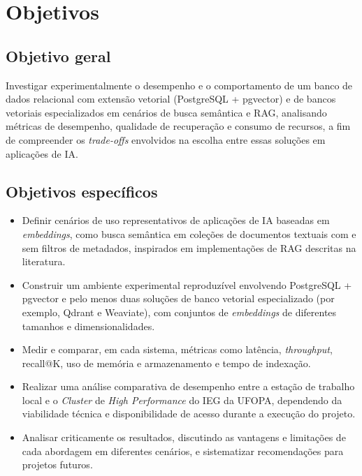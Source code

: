 
\section{Objetivos}

\subsection{Objetivo geral}

Investigar experimentalmente o desempenho e o comportamento de um banco de dados relacional com extensão vetorial (PostgreSQL + pgvector) e de bancos vetoriais especializados em cenários de busca semântica e RAG, analisando métricas de desempenho, qualidade de recuperação e consumo de recursos, a fim de compreender os \textit{trade-offs} envolvidos na escolha entre essas soluções em aplicações de IA.

\subsection{Objetivos específicos}

\begin{itemize}
    \item Definir cenários de uso representativos de aplicações de IA baseadas em \textit{embeddings}, como busca semântica em coleções de documentos textuais com e sem filtros de metadados, inspirados em implementações de RAG descritas na literatura.
    \item Construir um ambiente experimental reproduzível envolvendo PostgreSQL + pgvector e pelo menos duas soluções de banco vetorial especializado (por exemplo, Qdrant e Weaviate), com conjuntos de \textit{embeddings} de diferentes tamanhos e dimensionalidades.
    \item Medir e comparar, em cada sistema, métricas como latência, \textit{throughput}, recall@K, uso de memória e armazenamento e tempo de indexação.
    \item Realizar uma análise comparativa de desempenho entre a estação de trabalho local e o \textit{Cluster} de \textit{High Performance} do IEG da UFOPA, dependendo da viabilidade técnica e disponibilidade de acesso durante a execução do projeto.
    \item Analisar criticamente os resultados, discutindo as vantagens e limitações de cada abordagem em diferentes cenários, e sistematizar recomendações para projetos futuros.
\end{itemize}
